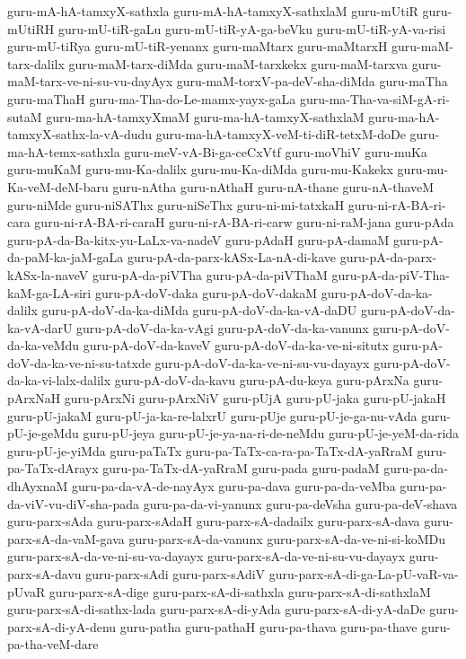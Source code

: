 {guru-mA-hA-tamxyX-sathxla
guru-mA-hA-tamxyX-sathxlaM
guru-mUtiR
guru-mUtiRH
guru-mU-tiR-gaLu
guru-mU-tiR-yA-ga-beVku
guru-mU-tiR-yA-va-risi
guru-mU-tiRya
guru-mU-tiR-yenanx
guru-maMtarx
guru-maMtarxH
guru-maM-tarx-dalilx
guru-maM-tarx-diMda
guru-maM-tarxkekx
guru-maM-tarxva
guru-maM-tarx-ve-ni-su-vu-dayAyx
guru-maM-torxV-pa-deV-sha-diMda
guru-maTha
guru-maThaH
guru-ma-Tha-do-Le-mamx-yayx-gaLa
guru-ma-Tha-va-siM-gA-ri-sutaM
guru-ma-hA-tamxyXmaM
guru-ma-hA-tamxyX-sathxlaM
guru-ma-hA-tamxyX-sathx-la-vA-dudu
guru-ma-hA-tamxyX-veM-ti-diR-tetxM-doDe
guru-ma-hA-temx-sathxla
guru-meV-vA-Bi-ga-ceCxVtf
guru-moVhiV
guru-muKa
guru-muKaM
guru-mu-Ka-dalilx
guru-mu-Ka-diMda
guru-mu-Kakekx
guru-mu-Ka-veM-deM-baru
guru-nAtha
guru-nAthaH
guru-nA-thane
guru-nA-thaveM
guru-niMde
guru-niSAThx
guru-niSeThx
guru-ni-mi-tatxkaH
guru-ni-rA-BA-ri-cara
guru-ni-rA-BA-ri-caraH
guru-ni-rA-BA-ri-carw
guru-ni-raM-jana
guru-pAda
guru-pA-da-Ba-kitx-yu-LaLx-va-nadeV
guru-pAdaH
guru-pA-damaM
guru-pA-da-paM-ka-jaM-gaLa
guru-pA-da-parx-kASx-La-nA-di-kave
guru-pA-da-parx-kASx-la-naveV
guru-pA-da-piVTha
guru-pA-da-piVThaM
guru-pA-da-piV-Tha-kaM-ga-LA-siri
guru-pA-doV-daka
guru-pA-doV-dakaM
guru-pA-doV-da-ka-dalilx
guru-pA-doV-da-ka-diMda
guru-pA-doV-da-ka-vA-daDU
guru-pA-doV-da-ka-vA-darU
guru-pA-doV-da-ka-vAgi
guru-pA-doV-da-ka-vanunx
guru-pA-doV-da-ka-veMdu
guru-pA-doV-da-kaveV
guru-pA-doV-da-ka-ve-ni-situtx
guru-pA-doV-da-ka-ve-ni-su-tatxde
guru-pA-doV-da-ka-ve-ni-su-vu-dayayx
guru-pA-doV-da-ka-vi-lalx-dalilx
guru-pA-doV-da-kavu
guru-pA-du-keya
guru-pArxNa
guru-pArxNaH
guru-pArxNi
guru-pArxNiV
guru-pUjA
guru-pU-jaka
guru-pU-jakaH
guru-pU-jakaM
guru-pU-ja-ka-re-lalxrU
guru-pUje
guru-pU-je-ga-nu-vAda
guru-pU-je-geMdu
guru-pU-jeya
guru-pU-je-ya-na-ri-de-neMdu
guru-pU-je-yeM-da-rida
guru-pU-je-yiMda
guru-paTaTx
guru-pa-TaTx-ca-ra-pa-TaTx-dA-yaRraM
guru-pa-TaTx-dArayx
guru-pa-TaTx-dA-yaRraM
guru-pada
guru-padaM
guru-pa-da-dhAyxnaM
guru-pa-da-vA-de-nayAyx
guru-pa-dava
guru-pa-da-veMba
guru-pa-da-viV-vu-diV-sha-pada
guru-pa-da-vi-yanunx
guru-pa-deVsha
guru-pa-deV-shava
guru-parx-sAda
guru-parx-sAdaH
guru-parx-sA-dadailx
guru-parx-sA-dava
guru-parx-sA-da-vaM-gava
guru-parx-sA-da-vanunx
guru-parx-sA-da-ve-ni-si-koMDu
guru-parx-sA-da-ve-ni-su-va-dayayx
guru-parx-sA-da-ve-ni-su-vu-dayayx
guru-parx-sA-davu
guru-parx-sAdi
guru-parx-sAdiV
guru-parx-sA-di-ga-La-pU-vaR-va-pUvaR
guru-parx-sA-dige
guru-parx-sA-di-sathxla
guru-parx-sA-di-sathxlaM
guru-parx-sA-di-sathx-lada
guru-parx-sA-di-yAda
guru-parx-sA-di-yA-daDe
guru-parx-sA-di-yA-denu
guru-patha
guru-pathaH
guru-pa-thava
guru-pa-thave
guru-pa-tha-veM-dare
}
